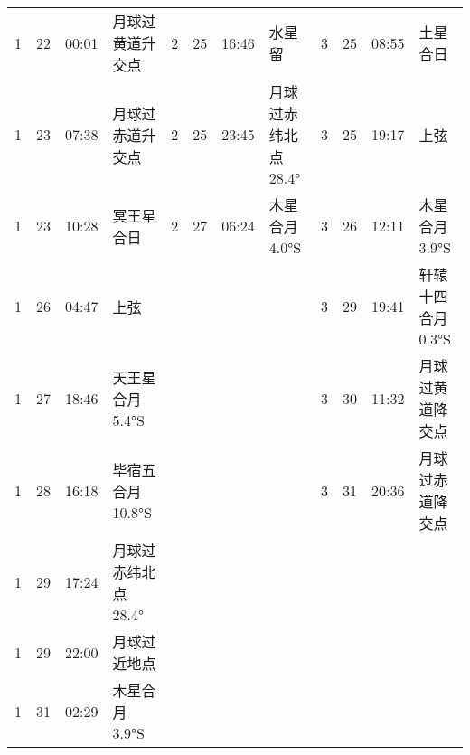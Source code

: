 \begin{tabular}{llll|llll|llll}
1 & 22 & 00:01 & 月球过黄道升交点 & 2 & 25 & 16:46 & 水星留 & 3 & 25 & 08:55 & 土星合日 \tabularnewline
1 & 23 & 07:38 & 月球过赤道升交点 & 2 & 25 & 23:45 & 月球过赤纬北点 28.4° & 3 & 25 & 19:17 & 上弦 \tabularnewline
1 & 23 & 10:28 & 冥王星合日 & 2 & 27 & 06:24 & 木星合月 4.0°S & 3 & 26 & 12:11 & 木星合月 3.9°S \tabularnewline
1 & 26 & 04:47 & 上弦 &  &  &  &  & 3 & 29 & 19:41 & 轩辕十四合月 0.3°S \tabularnewline
1 & 27 & 18:46 & 天王星合月 5.4°S &  &  &  &  & 3 & 30 & 11:32 & 月球过黄道降交点 \tabularnewline
1 & 28 & 16:18 & 毕宿五合月 10.8°S &  &  &  &  & 3 & 31 & 20:36 & 月球过赤道降交点 \tabularnewline
1 & 29 & 17:24 & 月球过赤纬北点 28.4° &  &  &  &  &  &  &  &  \tabularnewline
1 & 29 & 22:00 & 月球过近地点 &  &  &  &  &  &  &  &  \tabularnewline
1 & 31 & 02:29 & 木星合月 3.9°S &  &  &  &  &  &  &  &  \tabularnewline
\hline \end{tabular}


